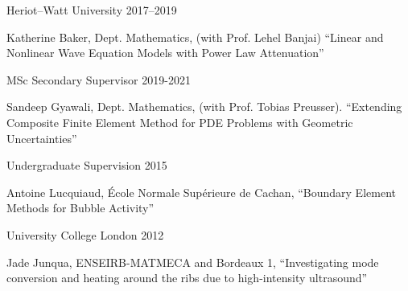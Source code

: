 \documentclass[11pt, a4paper]{awesome-cv}
\begin{document}
\begin{cventries}
{\begin{cvitems}
\end{cvitems}}%
{Heriot--Watt University}%
{}%
{2017--2019}%
{\begin{cvitems}%
\item Katherine Baker, Dept. Mathematics, (with Prof. Lehel Banjai) \enquote{Linear and Nonlinear Wave Equation Models with Power Law Attenuation}
\end{cvitems}}%
%
%
{MSc Secondary Supervisor}
{}
{2019-2021}{%
\begin{cvitems}
\item Sandeep Gyawali, Dept. Mathematics, (with Prof. Tobias Preusser). %
\enquote{Extending Composite Finite Element Method for PDE Problems with Geometric Uncertainties}
\end{cvitems}}
%
%
{Undergraduate Supervision}%
{}%
{2015}%
{\begin{cvitems}%
\item Antoine Lucquiaud, \'{E}cole Normale Sup\'{e}rieure de Cachan, \enquote{Boundary Element Methods for Bubble Activity} %
\end{cvitems}}%
{University College London}%
{}%
{2012}%
{\begin{cvitems}%
\item Jade Junqua, ENSEIRB-MATMECA and Bordeaux 1, \enquote{Investigating mode conversion and heating around the ribs due to high-intensity ultrasound}
\end{cvitems}}%
%
%
%
%
%
\end{cventries}
\end{document}
